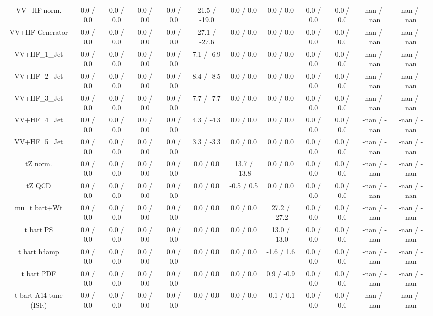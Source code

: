 \begin{table}[htbp]
\begin{center}
\begin{tabular}{|c|c|c|c|c|c|c|c|c|c|c|c|}
  VV+HF norm. & 0.0 / 0.0 & 0.0 / 0.0 & 0.0 / 0.0 & 0.0 / 0.0 & 21.5 / -19.0 & 0.0 / 0.0 & 0.0 / 0.0 & 0.0 / 0.0 & 0.0 / 0.0 & -nan / -nan & -nan / -nan \\ 
  VV+HF Generator & 0.0 / 0.0 & 0.0 / 0.0 & 0.0 / 0.0 & 0.0 / 0.0 & 27.1 / -27.6 & 0.0 / 0.0 & 0.0 / 0.0 & 0.0 / 0.0 & 0.0 / 0.0 & -nan / -nan & -nan / -nan \\ 
  VV+HF_1_Jet & 0.0 / 0.0 & 0.0 / 0.0 & 0.0 / 0.0 & 0.0 / 0.0 & 7.1 / -6.9 & 0.0 / 0.0 & 0.0 / 0.0 & 0.0 / 0.0 & 0.0 / 0.0 & -nan / -nan & -nan / -nan \\ 
  VV+HF_2_Jet & 0.0 / 0.0 & 0.0 / 0.0 & 0.0 / 0.0 & 0.0 / 0.0 & 8.4 / -8.5 & 0.0 / 0.0 & 0.0 / 0.0 & 0.0 / 0.0 & 0.0 / 0.0 & -nan / -nan & -nan / -nan \\ 
  VV+HF_3_Jet & 0.0 / 0.0 & 0.0 / 0.0 & 0.0 / 0.0 & 0.0 / 0.0 & 7.7 / -7.7 & 0.0 / 0.0 & 0.0 / 0.0 & 0.0 / 0.0 & 0.0 / 0.0 & -nan / -nan & -nan / -nan \\ 
  VV+HF_4_Jet & 0.0 / 0.0 & 0.0 / 0.0 & 0.0 / 0.0 & 0.0 / 0.0 & 4.3 / -4.3 & 0.0 / 0.0 & 0.0 / 0.0 & 0.0 / 0.0 & 0.0 / 0.0 & -nan / -nan & -nan / -nan \\ 
  VV+HF_5_Jet & 0.0 / 0.0 & 0.0 / 0.0 & 0.0 / 0.0 & 0.0 / 0.0 & 3.3 / -3.3 & 0.0 / 0.0 & 0.0 / 0.0 & 0.0 / 0.0 & 0.0 / 0.0 & -nan / -nan & -nan / -nan \\ 
  tZ norm. & 0.0 / 0.0 & 0.0 / 0.0 & 0.0 / 0.0 & 0.0 / 0.0 & 0.0 / 0.0 & 13.7 / -13.8 & 0.0 / 0.0 & 0.0 / 0.0 & 0.0 / 0.0 & -nan / -nan & -nan / -nan \\ 
  tZ QCD & 0.0 / 0.0 & 0.0 / 0.0 & 0.0 / 0.0 & 0.0 / 0.0 & 0.0 / 0.0 & -0.5 / 0.5 & 0.0 / 0.0 & 0.0 / 0.0 & 0.0 / 0.0 & -nan / -nan & -nan / -nan \\ 
   mu_{t bar{t}+Wt} & 0.0 / 0.0 & 0.0 / 0.0 & 0.0 / 0.0 & 0.0 / 0.0 & 0.0 / 0.0 & 0.0 / 0.0 & 27.2 / -27.2 & 0.0 / 0.0 & 0.0 / 0.0 & -nan / -nan & -nan / -nan \\ 
  t bar{t} PS & 0.0 / 0.0 & 0.0 / 0.0 & 0.0 / 0.0 & 0.0 / 0.0 & 0.0 / 0.0 & 0.0 / 0.0 & 13.0 / -13.0 & 0.0 / 0.0 & 0.0 / 0.0 & -nan / -nan & -nan / -nan \\ 
  t bar{t} hdamp & 0.0 / 0.0 & 0.0 / 0.0 & 0.0 / 0.0 & 0.0 / 0.0 & 0.0 / 0.0 & 0.0 / 0.0 & -1.6 / 1.6 & 0.0 / 0.0 & 0.0 / 0.0 & -nan / -nan & -nan / -nan \\ 
  t bar{t} PDF & 0.0 / 0.0 & 0.0 / 0.0 & 0.0 / 0.0 & 0.0 / 0.0 & 0.0 / 0.0 & 0.0 / 0.0 & 0.9 / -0.9 & 0.0 / 0.0 & 0.0 / 0.0 & -nan / -nan & -nan / -nan \\ 
  t bar{t} A14 tune (ISR) & 0.0 / 0.0 & 0.0 / 0.0 & 0.0 / 0.0 & 0.0 / 0.0 & 0.0 / 0.0 & 0.0 / 0.0 & -0.1 / 0.1 & 0.0 / 0.0 & 0.0 / 0.0 & -nan / -nan & -nan / -nan \\ 

\end{tabular}
\end{center}
\end{table}
